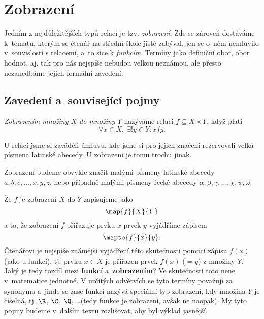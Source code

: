 \section{Zobrazení}\label{sec:zobrazeni}
Jedním z nejdůležitějších typů relací je tzv. \emph{zobrazení}. Zde se zároveň dostáváme k~tématu, kterým se čtenář na střední škole jistě zabýval, jen se o~něm nemluvilo v~souvislosti s relacemi, a~to sice k \emph{funkcím}. Termíny jako definiční obor, obor hodnot, aj. tak pro nás nejspíše nebudou velkou neznámou, ale přesto nezanedbáme jejich formální zavedení.

\subsection{Zavedení a~související pojmy}
\begin{definition}[Zobrazení]\label{def:zobrazeni}
    \emph{Zobrazením množiny $X$ do množiny $Y$} nazýváme relaci $f\subseteq X\times Y$, když platí
    \begin{equation*}
        \forall x\in X,\; \exists! y\in Y: xfy.
    \end{equation*}
\end{definition}
U relací jsme si zaváděli úmluvu, kde jsme si pro jejich značení rezervovali velká písmena latinské abecedy. U zobrazení je tomu trochu jinak.
\begin{convention}
    \sloppy Zobrazení budeme obvykle značit malými písmeny latinské abecedy $a,b,c,\dots,x,y,z$, nebo případně malými písmeny řecké abecedy $\alpha,\beta,\gamma,\dots,\chi,\psi,\omega$.
\end{convention}
Že $f$ je zobrazení $X$ do $Y$ zapisujeme jako
\begin{equation*}
    \map{f}{X}{Y}
\end{equation*}
a to, že zobrazení $f$ přiřazuje prvku $x$ prvek $y$ vyjádříme zápisem
\begin{equation*}
    \mapto{f}{x}{y}.
\end{equation*}
Čtenářovi je nejspíše známější vyjádření této skutečnosti pomocí zápisu $f(x)$ (jako u funkcí), tj. prvku $x\in X$ je přiřazen prvek $f(x)$ ($=y$) z množiny $Y$. Jaký je tedy rozdíl mezi \textbf{funkcí} a~\textbf{zobrazením}? Ve skutečnosti toto nene v~matematice jednotné. V určitých odvětvích se tyto termíny považují za synonyma a~jinde se zase funkcí nazývá speciální typ zobrazení, kdy množina $Y$ je číselná, tj. $\R$, $\C$, $\Q$, \dots (tedy funkce je zobrazení, avšak ne naopak). My tyto pojmy budeme v~dalším textu rozlišovat, aby byl výklad jasnější.\par
